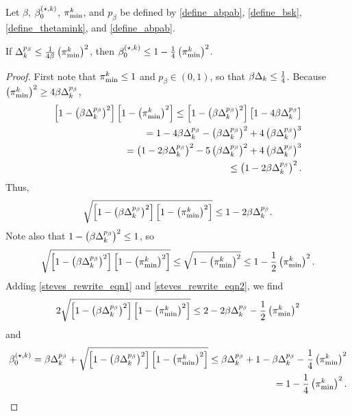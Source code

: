 \begin{lemma}
\label{boundbsk}
Let $\beta$, ${\beta_0^{(\star, k)}}$, ${\pi^k_{\textrm{min}}}$, and $p_{\beta}$ be defined by \cref{define_abpab}, \cref{define_bsk}, \cref{define_thetamink}, and \cref{define_abpab}.

If $\Delta_k^{p_{\beta}} \le \frac {1} {4\beta}\left({\pi^k_{\textrm{min}}}\right)^2$, then ${\beta_0^{(\star, k)}} \le 1 - \frac 1 4 \left({\pi^k_{\textrm{min}}}\right)^2$.
\end{lemma}


\begin{proof}
First note that ${\pi^k_{\textrm{min}}} \le 1$ and $p_{\beta} \in (0, 1)$, so that $\beta \Delta_k \le \frac 1 4$.
Because $\left({\pi^k_{\textrm{min}}}\right)^2 \ge 4\beta\Delta_k^{p_{\beta}}$,
\begin{align*}
    \left[1 - \left(\beta \Delta_k ^{p_{\beta}}\right)^2\right]\left[1 - \left({\pi^k_{\textrm{min}}} \right)^2\right]
\le \left[1 - \left(\beta \Delta_k ^{p_{\beta}}\right)^2\right]\left[1 - 4\beta \Delta_k^{p_{\beta}}\right] \\
= 1 - 4 \beta \Delta_k^{p_{\beta}} - \left(\beta \Delta_k^{p_{\beta}}\right)^2 + 4 \left(\beta \Delta_k^{p_{\beta}}\right)^3 \\
= \left(1 - 2 \beta \Delta_k^{p_{\beta}}\right)^2 - 5 \left(\beta\Delta_k^{p_{\beta}}\right)^2 + 4 \left(\beta \Delta_k^{p_{\beta}}\right)^3 \\
\le \left(1 - 2\beta\Delta_k^{p_{\beta}}\right)^2.
\end{align*}
Thus, 
\begin{align}
\label{steves_rewrite_eqn1}
\sqrt{\left[1 - \left(\beta \Delta_k ^{p_{\beta}}\right)^2\right]\left[1 - \left({\pi^k_{\textrm{min}}} \right)^2\right]} 
\le 1 - 2 \beta \Delta_k^{p_{\beta}}.
\end{align}
Note also that $1 - \left(\beta  \Delta_k ^{p_{\beta}}\right)^2 \le 1$, so
\begin{align}
\label{steves_rewrite_eqn2}
\sqrt{\left[1 - \left(\beta \Delta_k ^{p_{\beta}}\right)^2\right]\left[1 - \left({\pi^k_{\textrm{min}}} \right)^2\right]} 
\le \sqrt{1 - \left({\pi^k_{\textrm{min}}} \right)^2} \le 1 - \frac 1 2 \left({\pi^k_{\textrm{min}}} \right)^2.
\end{align}
Adding \cref{steves_rewrite_eqn1} and \cref{steves_rewrite_eqn2}, we find
\begin{align*}
2 \sqrt{\left[1 - \left(\beta \Delta_k ^{p_{\beta}}\right)^2\right]\left[1 - \left({\pi^k_{\textrm{min}}} \right)^2\right]} 
\le 2 - 2 \beta \Delta_k ^{p_{\beta}} - \frac 1 2 \left({\pi^k_{\textrm{min}}} \right)^2
\end{align*}
and
\begin{align*}
{\beta_0^{(\star, k)}} = \beta \Delta_k ^{p_{\beta}} + \sqrt{\left[1 - \left(\beta \Delta_k ^{p_{\beta}}\right)^2\right]\left[1 - \left({\pi^k_{\textrm{min}}} \right)^2\right]}
\le \beta \Delta_k ^{p_{\beta}} + 1 - \beta \Delta_k ^{p_{\beta}} - \frac 1 4 \left({\pi^k_{\textrm{min}}} \right)^2 \\
= 1 - \frac 1 4 \left({\pi^k_{\textrm{min}}} \right)^2.
\end{align*}
\end{proof}

